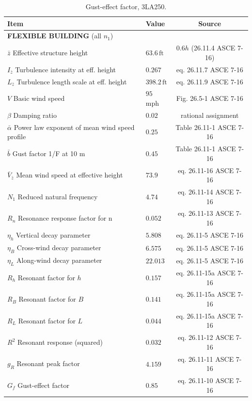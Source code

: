 \documentclass[onecolumn, fleqn]{article}
\newcommand{\ft}{\ensuremath{\,\mathrm{ft}}}
\begin{document}
\begin{table}[H]
\centering \caption{Gust-effect factor, 3LA250.}
\label{tab:gust_factor_8_story_bldg}
\begin{tabular}{llc}
\toprule
Item		& Value		& Source		\\
\midrule
\multicolumn{3}{l}{\textbf{FLEXIBLE BUILDING} (all $n_1$)}	\\
$\bar{z}$ Effective structure height							& $63.6 \ft$					& $0.6h$ (26.11.4 ASCE 7-16)	\\
$I_{\bar{z}}$ Turbulence intensity at eff. height				& $0.267$						& eq. 26.11.7 ASCE 7-16			\\
$L_{\bar{z}}$ Turbulence length scale at eff. height			& $398.2 \ft$					& eq. 26.11.9 ASCE 7-16			\\
$V$ Basic wind speed											& $95$ mph						& Fig. 26.5-1 ASCE 7-16			\\
$\beta$ Damping ratio											& $0.02$						& rational assignment			\\
$\bar{\alpha}$ Power law exponent of mean wind speed profile	& $0.25$						& Table 26.11-1 ASCE 7-16		\\
$\bar{b}$ Gust factor 1/F at 10 m								& $0.45$						& Table 26.11-1 ASCE 7-16		\\
$\bar{V}_{\bar{z}}$ Mean wind speed at effective height			& $73.9$						& eq. 26.11-16 ASCE 7-16		\\
$N_1$ Reduced natural frequency									& $4.74$						& eq. 26.11-14 ASCE 7-16		\\
$R_n$ Resonance response factor for n							& $0.052$						& eq. 26.11-13 ASCE 7-16		\\
$\eta_h$ Vertical decay parameter								& $5.808$						& eq. 26.11-5 ASCE 7-16			\\
$\eta_B$ Cross-wind decay parameter								& $6.575$						& eq. 26.11-5 ASCE 7-16			\\
$\eta_L$ Along-wind decay parameter								& $22.013$						& eq. 26.11-5 ASCE 7-16			\\
$R_h$ Resonant factor for $h$									& $0.157$							& eq. 26.11-15a ASCE 7-16			\\
$R_B$ Resonant factor for $B$									& $0.141$							& eq. 26.11-15a ASCE 7-16			\\
$R_L$ Resonant factor for $L$									& $0.044$							& eq. 26.11-15a ASCE 7-16			\\
$R^2$ Resonant response (squared)								& $0.032$							& eq. 26.11-12 ASCE 7-16			\\
$g_R$ Resonant peak factor										& $4.159$							& eq. 26.11-11 ASCE 7-16			\\
$G_f$ Gust-effect factor										& $0.85$							& eq. 26.11-10 ASCE 7-16			\\
\bottomrule
\end{tabular}
\end{table}
\end{document}

